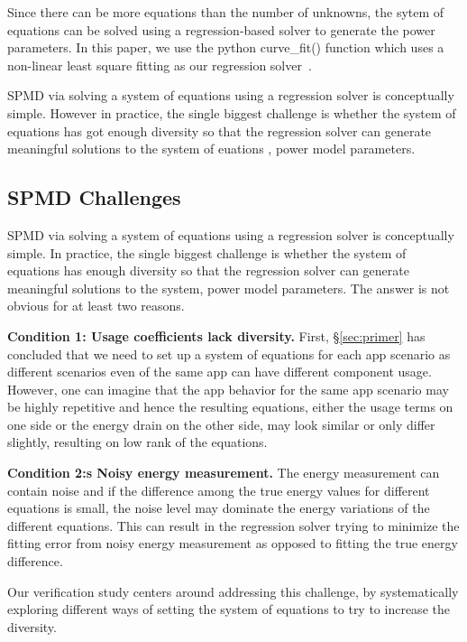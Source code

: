 Since there can be more equations than the number of unknowns, 
the sytem of equations can be solved using a regression-based solver to generate the power parameters.
In this paper, we use the python curve\_fit() function which uses a non-linear least square fitting as our regression solver~\cite{curvefit}.

SPMD via solving a system of equations using a regression solver is conceptually simple. 
However in practice, the single biggest challenge is whether the system of equations 
has got enough diversity so that the regression solver
can generate meaningful solutions to the system of euations , \ie power model parameters. 

\subsection{SPMD Challenges}
\label{subsec:challenges}

SPMD via solving a system of equations using a regression solver is conceptually simple. 
In practice, the single biggest challenge is whether the system of equations 
has enough diversity so that the regression solver
can generate meaningful solutions to the system, \ie power model parameters. 
The answer is not obvious for at least two reasons. 

{\bf Condition 1: Usage coefficients lack diversity.}
First, \S\ref{sec:primer} has concluded that
we need to set up a system of equations for each app scenario as different scenarios
even of the same app can have different component usage. However, 
one can imagine that the app behavior for the same app scenario may be highly repetitive and hence
the resulting equations, either the usage terms on one side or the energy drain on the other side,
 may look similar or only differ slightly, resulting on low rank of the equations. 

{\bf Condition 2:s Noisy energy measurement.}
The energy measurement can contain noise and if the difference among the true energy values for different equations is small, the noise level may dominate the energy variations of the different equations. This can result in the regression solver trying to minimize the fitting error from noisy energy measurement as opposed to fitting the true energy difference.  

Our verification study centers around addressing this challenge, by systematically exploring different ways of setting the system of equations to try to increase the diversity.

